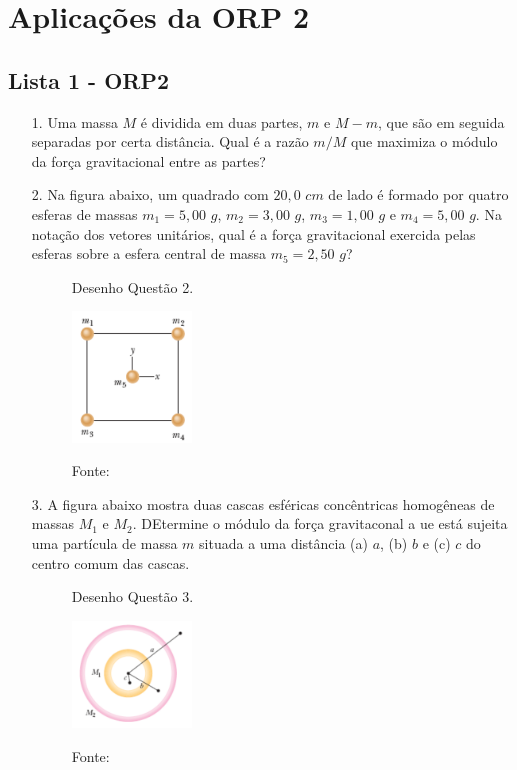 \chapter{Aplicações da ORP 2} \label{apendice:orp2}

\section{Lista 1 - ORP2} \label{orp2l1}
\begin{itemize}
    \item[1.] \textbf{\cite{Halliday2009vol2}} Uma massa $M$ é dividida em duas partes, $m$ e $M-m$, que são em seguida separadas por certa distância. Qual é a razão $m/M$ que maximiza o módulo da força gravitacional entre as partes?

    \item[2.] \textbf{\cite{Halliday2009vol2}} Na figura abaixo, um quadrado com $20,0$ $cm$ de lado é formado por quatro esferas de massas $m_1=5,00$ $g$, $m_2 = 3,00$ $g$, $m_3 = 1,00$ $g$ e $m_4 = 5,00$ $g$. Na notação dos vetores unitários, qual é a força gravitacional exercida pelas esferas sobre a esfera central de massa $m_5 = 2,50$ $g$?
\begin{figure}[H]
\begin{center}
\caption*{Desenho Questão 2.}
\includegraphics[width=0.3\textwidth]{fig/orp2l1q2.png}
\label{fig:ORP2q2}
\caption*{Fonte: }
\end{center}
\end{figure}

    \item[3.] \textbf{\cite{Halliday2009vol2}} A figura abaixo mostra duas cascas esféricas concêntricas homogêneas de massas $M_1$ e $M_2$. DEtermine o módulo da força gravitaconal a ue está sujeita uma partícula de massa $m$ situada a uma distância (a) $a$, (b) $b$ e (c) $c$ do centro comum das cascas.

\begin{figure}[H]
\begin{center}
\caption*{Desenho Questão 3.}
\includegraphics[width=0.3\textwidth]{fig/orp2l1q3.png}
\label{fig:ORP2q3}
\caption*{Fonte: }
\end{center}
\end{figure}


\end{itemize}
